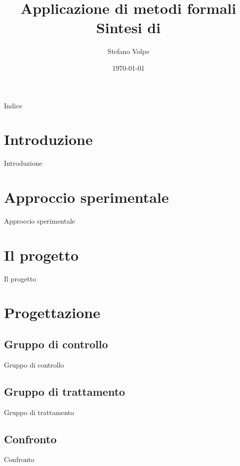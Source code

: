 \documentclass{beamer}
\title{
	Applicazione di metodi formali \\
	\small Sintesi di \cite{sobel}
}
\author{Stefano Volpe}
\institute{Università di Bologna}
\date{\today}
\begin{document}
\begin{frame}
	\titlepage
\end{frame}

\begin{frame}{Indice}
	\tableofcontents
\end{frame}

\section{Introduzione}
\begin{frame}{Introduzione}

\end{frame}

\section{Approccio sperimentale}
\begin{frame}{Approccio sperimentale}

\end{frame}

\section{Il progetto}
\begin{frame}{Il progetto}

\end{frame}

\section{Progettazione}

\subsection{Gruppo di controllo}
\begin{frame}{Gruppo di controllo}

\end{frame}

\subsection{Gruppo di trattamento}
\begin{frame}{Gruppo di trattamento}

\end{frame}

\subsection{Confronto}
\begin{frame}{Confronto}

\end{frame}
\end{document}

